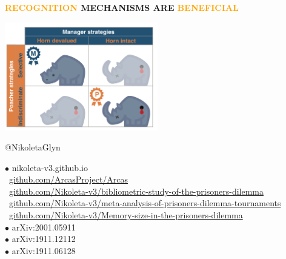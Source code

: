 \documentclass{beamer}
\begin{document}
\begin{frame}
    \begin{center}
    \Large{\textbf{\textcolor{orange}{RECOGNITION} MECHANISMS ARE \textcolor{orange}{BENEFICIAL}}} \\
    \end{center}
\end{frame}

\begin{frame}
    \begin{center}
    \includegraphics[width=0.5\textwidth]{static/RhinoPic.pdf}\hspace{12pt}
     \\
    \end{center}
\end{frame}

\begin{frame}
    \begin{center}
    \faTwitter @NikoletaGlyn \\
    
    \vspace{1cm}
    \end{center}

    \footnotesize
    $\bullet$ nikoleta-v3.github.io \\
    \faGithub \ \url{github.com/ArcasProject/Arcas} \\
    \faGithub \ \url{github.com/Nikoleta-v3/bibliometric-study-of-the-prisoners-dilemma} \\
    \faGithub \ \url{github.com/Nikoleta-v3/meta-analysis-of-prisoners-dilemma-tournaments} \\
    \faGithub \ \url{github.com/Nikoleta-v3/Memory-size-in-the-prisoners-dilemma} \\
    $\bullet$ arXiv:2001.05911 \\
    $\bullet$ arXiv:1911.12112 \\
    $\bullet$ arXiv:1911.06128 \\
\end{frame}
\end{document}
